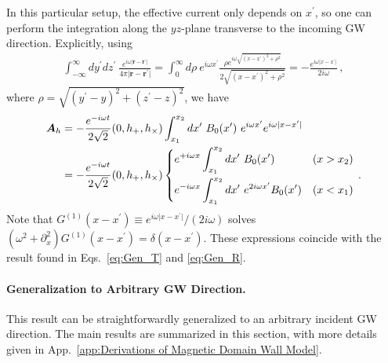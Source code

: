 \documentclass[a4paper,11pt]{article}
\begin{document}
In this particular setup, the effective current only depends on $ x^{\prime} $, so one can perform the integration along the $ yz$-plane  transverse to the incoming GW direction.
%
Explicitly, using
%
\begin{align}
     \int_{-\infty}^{\infty} dy^{\prime} dz^{\prime}  
    ~
    \frac{e^{i \omega \vert \bm{r} - \bm{r}^{\prime} \vert} }{ 4\pi  \vert \bm{r} - \bm{r}^{\prime} \vert } 
     =  
 \int_{0}^{\infty}  d\rho
    ~  e^{i \omega x^{\prime} }  \frac{\rho e^{i \omega \sqrt{ (x-x^{\prime})^{2} + \rho^{2 }   } } }{ 2 \sqrt{ (x-x^{\prime})^{2} + \rho^{2 }  } }  = - \frac{e^{i \omega \vert x - x^{\prime} \vert}}{2 i \omega} \,, \label{eq:3Dto1D}
\end{align}
%
where $ \rho = \sqrt{(y^{\prime} - y)^{2} + (z^{\prime} - z)^{2} }$, we have
%
\begin{align}
   \bm{A}_{h} & = -  \frac{ e^{- i \omega t}}{2  \sqrt{2} } ( 0, h_{+}, h_{\times})  \int_{x_{1}}^{x_{2}}{dx^{\prime}} ~  B_{0}  (x^{\prime}) 
    ~  e^{i \omega x^{\prime} }  e^{i \omega \vert x - x^{\prime} \vert} \nonumber \\
    & =  -  \frac{ e^{- i \omega t}}{2  \sqrt{2}  }
    ( 0, h_{+}, h_{\times}) 
    \begin{dcases}
        e^{+ i \omega x} \int_{x_{1}}^{x_{2}}{dx^{\prime}} ~  B_{0}  (x^{\prime}) & (x > x_{2}) \\
        e^{- i \omega x} \int_{x_{1}}^{x_{2}}{dx^{\prime}} ~  e^{2 i \omega x^{\prime} }   B_{0}  (x^{\prime})  & (x < x_{1}) 
    \end{dcases} \,.
    \label{eq:Gen_TR_green}
\end{align}
%
Note that $  G^{(1)}(x-x^{\prime}) \equiv e^{i \omega \vert x - x^{\prime} \vert}/ (2 i \omega) $ solves
$ (\omega^{2} + \partial_{x}^{2}) G^{(1)} (x-x^{\prime}) = \delta(x-x^{\prime}) $.
These expressions coincide with the result found in Eqs.~\eqref{eq:Gen_T} and \eqref{eq:Gen_R}.



\paragraph{Generalization to Arbitrary GW Direction.}
%
This result can be straightforwardly generalized to an arbitrary incident GW direction. The main results are summarized in this section, with more details given in App.~\ref{app:Derivations of Magnetic Domain Wall Model}.
\end{document}
